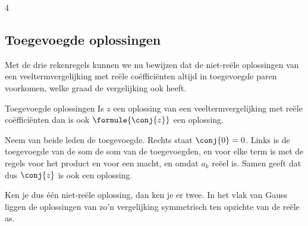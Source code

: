 \begin{alleenvoor}{4}

\begin{oefeningen}
\end{oefeningen}

\subsection{Toegevoegde oplossingen}

Met de drie rekenregels kunnen we nu bewijzen dat de niet-reële oplossingen van een veeltermvergelijking met reële coëfficiënten altijd in toegevoegde paren voorkomen, welke graad de vergelijking ook heeft.

\begin{theorie}
\begin{stelling}{Toegevoegde oplossingen}
Is $z$ een oplossing van een veeltermvergelijking met reële coëfficiënten
dan is ook $\formule{\conj{z}}$ een oplossing.
\end{stelling}

\begin{bewijs}
Neem van beide leden de toegevoegde. Rechts staat $\conj{0} = 0$. Links is de toegevoegde van de som de som van de toegevoegden, en voor elke term is
met de regels voor het product en voor een macht, en omdat $a_k$ reëel is. Samen geeft dat
dus $\conj{z}$ is ook een oplossing.
\end{bewijs}
\end{theorie}

Ken je dus één niet-reële oplossing, dan ken je er twee. In het vlak van Gauss liggen de oplossingen van zo'n vergelijking symmetrisch ten opzichte van de reële as.


\end{alleenvoor}
